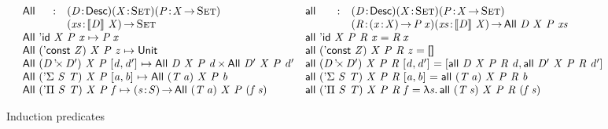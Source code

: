 \begin{figure*}

\[
\begin{array}{ll}
\stk{
\begin{array}{@{}ll}
\All{}{}{}{} : & \PITEL{\V{D}}{\Desc}
                 \PITEL{\V{X}}{\Set}
                 \PITEL{\V{P}}{\V{X} \To \Set} \\
               & \PI{\V{xs}}{\descop{\V{D}}{\V{X}}} 
                 \Set 
\end{array} \\
\All{\DId}{\V{X}}{\V{P}}{\V{x}} \mapsto \V{P}\: \V{x} \\
\All{(\DConst{\V{Z}})}{\V{X}}{\V{P}}{\V{z}} \mapsto \Unit \\
\All{(\DProd{\V{D}}{\V{D'}})}{\V{X}}{\V{P}}{\pair{\V{d}}{\V{d'}}{}} \mapsto \TIMES{\All{\V{D}}{\V{X}}{\V{P}}{\V{d}}}{\All{\V{D'}}{\V{X}}{\V{P}}{\V{d'}}} \\
\All{(\DSigma{\V{S}}{\V{T}})}{\V{X}}{\V{P}}{\pair{\V{a}}{\V{b}}{}} \mapsto \All{(\V{T}\: \V{a})}{\V{X}}{\V{P}}{\V{b}} \\
\All{(\DPi{\V{S}}{\V{T}})}{\V{X}}{\V{P}}{\V{f}} \mapsto \PI{\V{\V{s}}}{\V{S}} \All{(\V{T}\: \V{a})}{\V{X}}{\V{P}}{(\V{f}\: \V{s})}
}
&
\stk{
\begin{array}{@{}ll}
\all{}{}{}{}{} : & \PITEL{\V{D}}{\Desc}
                   \PITEL{\V{X}}{\Set}
                   \PITEL{\V{P}}{\V{X} \To \Set} \\
                 & \PITEL{\V{R}}{\PI{\V{x}}{\V{X}} \V{P}\: \V{x}}
                   \PI{\V{xs}}{\descop{\V{D}}{\V{X}}} 
                   \All{\V{D}}{\V{X}}{\V{P}}{\V{xs}} 
\end{array} \\
\all{\DId}{\V{X}}{\V{P}}{\V{R}}{\V{x}} = \V{R}\: \V{x} \\
\all{(\DConst{\V{Z}})}{\V{X}}{\V{P}}{\V{R}}{\V{z}} = \Void \\
\all{(\DProd{\V{D}}{\V{D'}})}{\V{X}}{\V{P}}{\V{R}}{\pair{\V{d}}{\V{d'}}{}} = \pair{\all{\V{D}}{\V{X}}{\V{P}}{\V{R}}{\V{d}}}{\all{\V{D'}}{\V{X}}{\V{P}}{\V{R}}{\V{d'}}}{} \\
\all{(\DSigma{\V{S}}{\V{T}})}{\V{X}}{\V{P}}{\V{R}}{\pair{\V{a}}{\V{b}}{}} = \all{(\V{T}\: \V{a})}{\V{X}}{\V{P}}{\V{R}}{\V{b}} \\
\all{(\DPi{\V{S}}{\V{T}})}{\V{X}}{\V{P}}{\V{R}}{\V{f}} = \LAM{\V{s}} \all{(\V{T}\: \V{s})}{\V{X}}{\V{P}}{\V{R}}{(\V{f}\: \V{s})}
\end{array}
}
\]

\caption{Induction predicates}
\label{fig:all-predicates}

\end{figure*}

